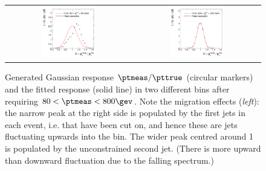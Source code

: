 \begin{figure}[ht]
  \centering
  \begin{tabular}{cc}
    \includegraphics[width=0.45\textwidth]{figures/resFit_ToyMC_PtCuts_ResolutionBin1} &
    \includegraphics[width=0.45\textwidth]{figures/resFit_ToyMC_PtCuts_ResolutionBin7} \\
  \end{tabular}
  \caption{Generated Gaussian response \mbox{$\ptmeas / \pttrue$}
    (circular markers) and the fitted
    response (solid line) in two different \pttrue bins after
    requiring \mbox{$80 < \ptmeas < 800\gev$}.
    Note the migration effects (\textit{left}): the narrow peak at the
    right side is populated by the first jets in each event, i.e. that have been cut on, and hence these are jets fluctuating upwards into the \pt bin.
    The wider peak centred around 1 is populated by the unconstrained
    second jet.
    (There is more upward than downward fluctuation due to the falling
    \pttrue spectrum.)
  }
  \label{fig:ResFit:ToyMC:PtCuts:Response}
\end{figure}

